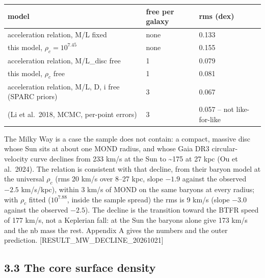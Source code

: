 \documentclass[
  10pt,
]{article}
\begin{document}
\begin{longtable}[]{@{}lll@{}}
\toprule
model & free per galaxy & rms (dex)\tabularnewline
\midrule
\endhead
acceleration relation, M/L fixed & none & 0.133\tabularnewline
this model, $\rho_c=10^{7.45}$ & none & 0.155\tabularnewline
acceleration relation, M/L\_disc free & 1 & 0.079\tabularnewline
this model, $\rho_c$ free & 1 & 0.081\tabularnewline
acceleration relation, M/L, D, i free (SPARC priors) & 3 &
0.067\tabularnewline
(Li et al.~2018, MCMC, per-point errors) & 3 & 0.057 -- not
like-for-like\tabularnewline
\bottomrule
\end{longtable}

The Milky Way is a case the sample does not contain: a compact, massive disc whose Sun sits at about one MOND radius, and whose Gaia DR3 circular-velocity curve declines from 233 km/s at the Sun to \textasciitilde{}175 at 27 kpc (Ou et al.~2024). The relation is consistent with that decline, from their baryon model at the universal $\rho_c$ (rms 20 km/s over 8--27 kpc, slope $-1.9$ against the observed $-2.5$ km/s/kpc), within 3 km/s of MOND on the same baryons at every radius; with $\rho_c$ fitted ($10^{7.88}$, inside the sample spread) the rms is 9 km/s (slope $-3.0$ against the observed $-2.5$). The decline is the transition toward the BTFR speed of 177 km/s, not a Keplerian fall: at the Sun the baryons alone give 173 km/s and the nb mass the rest. Appendix A gives the numbers and the outer prediction. {[}RESULT\_MW\_DECLINE\_20261021{]}

\subsection{3.3 The core surface density}\label{the-core-surface-density}
\end{document}
